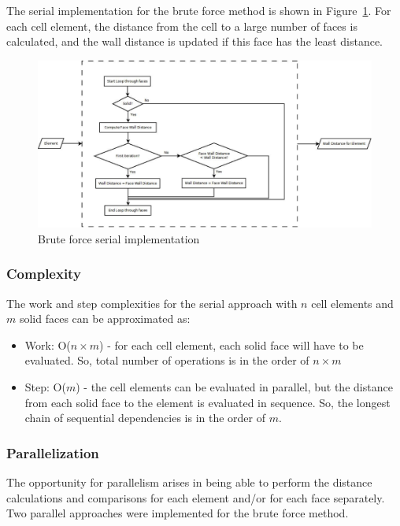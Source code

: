 \documentclass[]{aiaa-tc}%
\begin{document}
The serial implementation for the brute force method is shown in
Figure~\ref{f:bf_2}. For each cell element, the distance from the cell
to a large number of faces is calculated, and the wall distance is
updated if this face has the least distance. 

\begin{figure}
  \centering
  \includegraphics[]{figures/brute_force/bf_2}
  \caption{Brute force serial implementation}
  \label{f:bf_2}
\end{figure}



\subsubsection{Complexity}

The work and step complexities for the serial approach with $n$ cell
elements and $m$ solid faces can be approximated as: 

\begin{itemize}
  
\item Work: O($n \times m$) - for each cell element, each solid face
  will have to be evaluated.  So, total number of operations is in the
  order of $n \times m$
  
\item Step: O($m$) - the cell elements can be evaluated in parallel,
  but the distance from each solid face to the element is evaluated in
  sequence.  So, the longest chain of sequential dependencies is in
  the order of $m$.
  
\end{itemize}

\subsubsection{Parallelization}
The opportunity for parallelism arises in being able to perform the
distance calculations and comparisons for each element and/or for each
face separately.  Two parallel approaches were implemented for the
brute force method.
\end{document}
